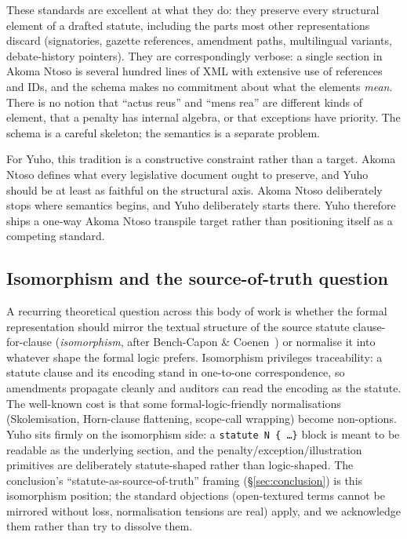 These standards are excellent at what they do: they preserve every
structural element of a drafted statute, including the parts most other
representations discard (signatories, gazette references, amendment paths,
multilingual variants, debate-history pointers). They are correspondingly
verbose: a single section in Akoma Ntoso is several hundred lines of XML
with extensive use of references and IDs, and the schema makes no
commitment about what the elements \emph{mean}. There is no notion that
``actus reus'' and ``mens rea'' are different kinds of element, that a
penalty has internal algebra, or that exceptions have priority. The
schema is a careful skeleton; the semantics is a separate problem.

For Yuho, this tradition is a constructive constraint rather than a target.
Akoma Ntoso defines what every legislative document ought to preserve, and
Yuho should be at least as faithful on the structural axis. Akoma Ntoso
deliberately stops where semantics begins, and Yuho deliberately starts
there. Yuho therefore ships a one-way Akoma Ntoso transpile target rather
than positioning itself as a competing standard.

\subsection{Isomorphism and the source-of-truth question}
\label{subsec:isomorphism}
A recurring theoretical question across this body of work is whether
the formal representation should mirror the textual structure of the
source statute clause-for-clause (\emph{isomorphism}, after Bench-Capon
\& Coenen~\cite{benchcapon1992isomorphism}) or normalise it into
whatever shape the formal logic prefers. Isomorphism privileges
traceability: a statute clause and its encoding stand in
one-to-one correspondence, so amendments propagate cleanly and
auditors can read the encoding as the statute. The well-known cost is
that some formal-logic-friendly normalisations (Skolemisation,
Horn-clause flattening, scope-call wrapping) become non-options. Yuho
sits firmly on the isomorphism side: a \texttt{statute N \{ \dots \}}
block is meant to be readable as the underlying section, and the
penalty/exception/illustration primitives are deliberately
statute-shaped rather than logic-shaped. The conclusion's
``statute-as-source-of-truth'' framing (\S\ref{sec:conclusion}) is
this isomorphism position; the standard objections (open-textured
terms cannot be mirrored without loss, normalisation tensions are
real) apply, and we acknowledge them rather than try to dissolve them.

